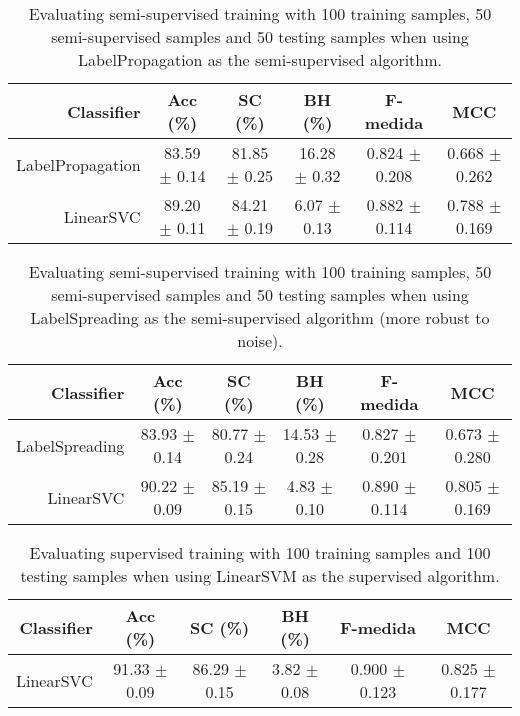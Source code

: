 \begin{table}[!htb]
\footnotesize
\centering
\caption{Evaluating semi-supervised training with 100 training samples, 50 semi-supervised samples and 50 testing samples when using LabelPropagation as the semi-supervised algorithm.}
\label{tab:label-propagation-PewDiePie_gRyPjRrjS34}
\begin{tabular}{r|c|c|c|c|c}
\hline\hline
Classifier & Acc (\%) & SC (\%) & BH (\%) & F-medida & MCC \\ \hline
LabelPropagation & 83.59 $\pm$ 0.14 & 81.85 $\pm$ 0.25 & 16.28 $\pm$ 0.32 & 0.824 $\pm$ 0.208 & 0.668 $\pm$ 0.262 \\
LinearSVC & 89.20 $\pm$ 0.11 & 84.21 $\pm$ 0.19 & 6.07 $\pm$ 0.13 & 0.882 $\pm$ 0.114 & 0.788 $\pm$ 0.169 \\
\hline\hline
\end{tabular}
\end{table}
\begin{table}[!htb]
\footnotesize
\centering
\caption{Evaluating semi-supervised training with 100 training samples, 50 semi-supervised samples and 50 testing samples when using LabelSpreading as the semi-supervised algorithm (more robust to noise).}
\label{tab:label-spreading-PewDiePie_gRyPjRrjS34}
\begin{tabular}{r|c|c|c|c|c}
\hline\hline
Classifier & Acc (\%) & SC (\%) & BH (\%) & F-medida & MCC \\ \hline
LabelSpreading & 83.93 $\pm$ 0.14 & 80.77 $\pm$ 0.24 & 14.53 $\pm$ 0.28 & 0.827 $\pm$ 0.201 & 0.673 $\pm$ 0.280 \\
LinearSVC & 90.22 $\pm$ 0.09 & 85.19 $\pm$ 0.15 & 4.83 $\pm$ 0.10 & 0.890 $\pm$ 0.114 & 0.805 $\pm$ 0.169 \\
\hline\hline
\end{tabular}
\end{table}
\begin{table}[!htb]
\footnotesize
\centering
\caption{Evaluating supervised training with 100 training samples and 100 testing samples when using LinearSVM as the supervised algorithm.}
\label{tab:linear-svm-PewDiePie_gRyPjRrjS34}
\begin{tabular}{r|c|c|c|c|c}
\hline\hline
Classifier & Acc (\%) & SC (\%) & BH (\%) & F-medida & MCC \\ \hline
LinearSVC & 91.33 $\pm$ 0.09 & 86.29 $\pm$ 0.15 & 3.82 $\pm$ 0.08 & 0.900 $\pm$ 0.123 & 0.825 $\pm$ 0.177 \\
\hline\hline
\end{tabular}
\end{table}
